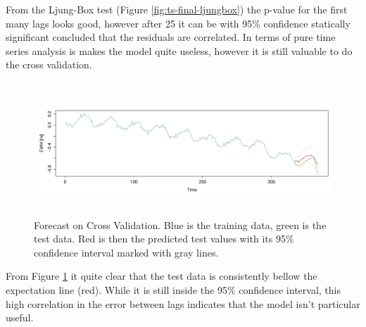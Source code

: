 From the Ljung-Box test (Figure \ref{fig:ts-final-ljungbox}) the p-value for the first many lags looks good, however after 25 it can be with 95\% confidence statically significant concluded that the residuals are correlated. In terms of pure time series analysis is makes the model quite useless, however it is still valuable to do the cross validation.

\begin{figure}[H]
\centering
\centerline{\includegraphics[height=5cm]{figures/ts-final-forecast}}
\caption{Forecast on Cross Validation. Blue is the training data, green is the test data. Red is then the predicted test values with its 95\% confidence interval marked with gray lines.}
\label{fig:ts-final-forecast}
\end{figure}

From Figure \ref{fig:ts-final-forecast} it quite clear that the test data is consistently bellow the expectation line (red). While it is still inside the 95\% confidence interval, this high correlation in the error between lags indicates that the model isn't particular useful. 

